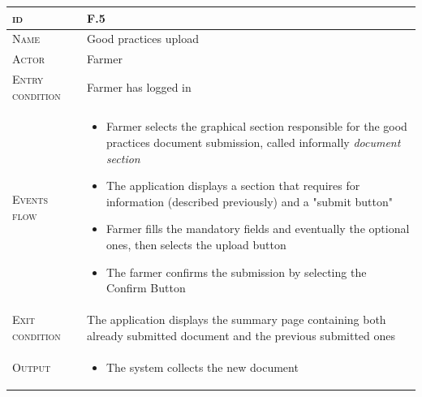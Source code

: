 
\begin{table}[H]
    \centering
    \begin{tabular}{|l|m{}|}
        \hline %
    	\textsc{id}                 &   F.5\\
    	\hline %
    	\textsc{Name}               &   Good practices upload\\
    	\hline %
    	\textsc{Actor}             &   Farmer\\
    	\hline %
    	\textsc{Entry condition}   &   Farmer has logged in\\
    	\hline %
    	\textsc{Events flow}         &   %
            	                        \begin{itemize}
                                    	    \item Farmer selects the graphical section responsible for the good practices document submission, called informally \textit{document section}
                                    		\item The application displays a section that requires for information (described previously) and a "submit button"
                                    		\item Farmer fills the mandatory fields and eventually the optional ones, then selects the upload button
                                    		\item The farmer confirms the submission by selecting the Confirm Button
                                        \end{itemize}\\
        \hline %
        \textsc{Exit condition}    &  The application displays the summary page containing both already submitted document and the previous submitted ones\\
    	\hline %
    	\textsc{Output}             &  \begin{itemize}
    	    \item The system collects the new document

\end{itemize}
\end{tabular}
\end{table}
